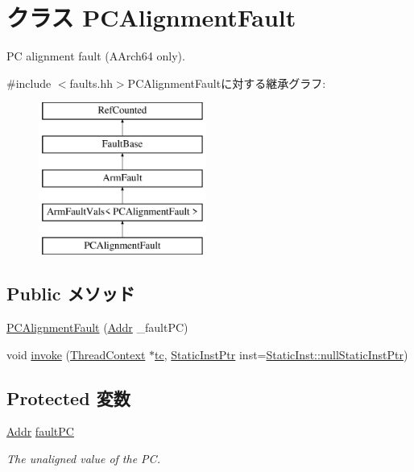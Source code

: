 \hypertarget{classArmISA_1_1PCAlignmentFault}{
\section{クラス PCAlignmentFault}
\label{classArmISA_1_1PCAlignmentFault}
}


PC alignment fault (AArch64 only).  


{\ttfamily \#include $<$faults.hh$>$}PCAlignmentFaultに対する継承グラフ:\begin{figure}[H]
\begin{center}
\leavevmode
\includegraphics[height=5cm]{classArmISA_1_1PCAlignmentFault}
\end{center}
\end{figure}
\subsection*{Public メソッド}
\begin{DoxyCompactItemize}
\item 
\hyperlink{classArmISA_1_1PCAlignmentFault_a16a334acc3968c1fc6cbeed896fae45c}{PCAlignmentFault} (\hyperlink{classm5_1_1params_1_1Addr}{Addr} \_\-faultPC)
\item 
void \hyperlink{classArmISA_1_1PCAlignmentFault_a2bd783b42262278d41157d428e1f8d6f}{invoke} (\hyperlink{classThreadContext}{ThreadContext} $\ast$\hyperlink{namespaceArmISA_a5aff829af55e65b802d83dfcef4e9dd0}{tc}, \hyperlink{classRefCountingPtr}{StaticInstPtr} inst=\hyperlink{classStaticInst_aa793d9793af735f09096369fb17567b6}{StaticInst::nullStaticInstPtr})
\end{DoxyCompactItemize}
\subsection*{Protected 変数}
\begin{DoxyCompactItemize}
\item 
\hyperlink{classm5_1_1params_1_1Addr}{Addr} \hyperlink{classArmISA_1_1PCAlignmentFault_af8e1c40a0f10f0875e5ce4a62fdc3d7f}{faultPC}
\begin{DoxyCompactList}\small\item\em The unaligned value of the PC. \item\end{DoxyCompactList}\end{DoxyCompactItemize}



